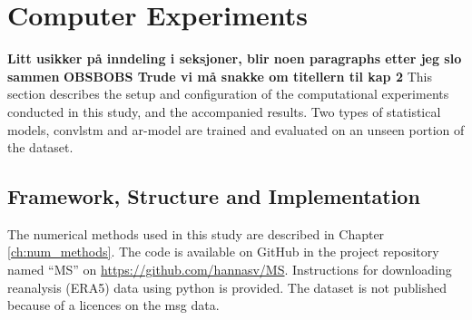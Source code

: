 \section{Computer Experiments} \label{ch:computer_experiments}
\textbf{Litt usikker på inndeling i seksjoner, blir noen paragraphs etter jeg slo sammen }
\textbf{OBSBOBS Trude vi må snakke om titellern til kap 2}
This section describes the setup and configuration of the computational experiments conducted in this study, and the accompanied results. Two types of statistical models, \acrshort{convlstm} and \acrshort{ar}-model are trained and evaluated on an unseen portion of the dataset. 

\subsection{Framework, Structure and Implementation} \label{sec:structure_and_implementations} \label{sec:framework}
The numerical methods used in this study are described in Chapter \ref{ch:num_methods}. The code is available on GitHub in the project repository named ``MS'' on \href{https://github.com/hannasv/MS}{https://github.com/hannasv/MS}. Instructions for downloading 
reanalysis (ERA5) data using python is provided. 
The dataset is not published because of a licences on the \acrshort{msg} data. 





